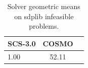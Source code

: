 \begin{table}
\centering
\caption{Solver geometric means on sdplib infeasible problems.}
\label{t-sdplib infeasible-geom_mean}
\begin{tabular}{lcc}
\toprule
 SCS-3.0 &  COSMO \\
\midrule
    1.00 &  52.11 \\
\bottomrule
\end{tabular}
\end{table}
